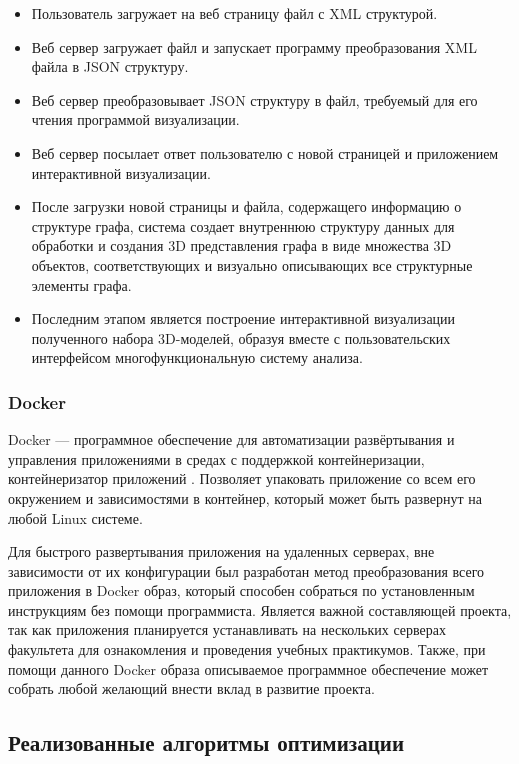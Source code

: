 \begin{itemize}
    \item Пользователь загружает на веб страницу файл с XML структурой.
    \item Веб сервер загружает файл и запускает программу преобразования XML файла в JSON структуру.
    \item Веб сервер преобразовывает JSON структуру в файл, требуемый для его чтения программой визуализации.
    \item Веб сервер посылает ответ пользователю с новой страницей и приложением интерактивной визуализации.
    \item После загрузки новой страницы и файла, содержащего информацию о структуре графа, система создает внутреннюю структуру данных для обработки и создания 3D представления графа в виде множества 3D объектов, соответствующих и визуально описывающих все структурные элементы графа.
    \item Последним этапом является построение интерактивной визуализации полученного набора 3D-моделей, образуя вместе с пользовательских интерфейсом многофункциональную систему анализа.
\end{itemize}

\subsubsection{Docker}

Docker — программное обеспечение для автоматизации развёртывания и управления приложениями в средах с поддержкой контейнеризации, контейнеризатор приложений \cite{docker_offc}. Позволяет упаковать приложение со всем его окружением и зависимостями в контейнер, который может быть развернут на любой Linux системе.

Для быстрого развертывания приложения на удаленных серверах, вне зависимости от их конфигурации был разработан метод преобразования всего приложения в Docker образ, который способен собраться по установленным инструкциям без помощи программиста. Является важной составляющей проекта, так как приложения планируется устанавливать на нескольких серверах факультета для ознакомления и проведения учебных практикумов. Также, при помощи данного Docker образа описываемое программное обеспечение может собрать любой желающий внести вклад в развитие проекта.

\subsection{Реализованные алгоритмы оптимизации}

